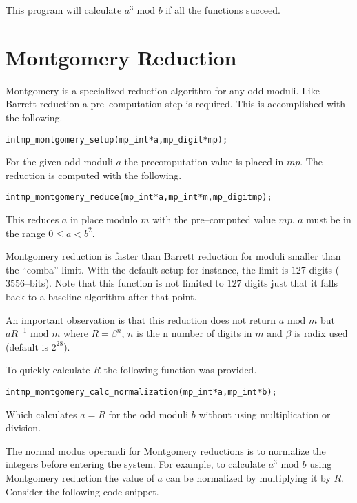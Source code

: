 \documentclass[synpaper]{book}
\begin{document}
This program will calculate $a^3 \mbox{ mod }b$ if all the functions succeed.

\section{Montgomery Reduction}

Montgomery is a specialized reduction algorithm for any odd moduli.  Like Barrett reduction a pre--computation
step is required.  This is accomplished with the following.

\begin{alltt}
int mp_montgomery_setup(mp_int *a, mp_digit *mp);
\end{alltt}

For the given odd moduli $a$ the precomputation value is placed in $mp$.  The reduction is computed with the
following.

\begin{alltt}
int mp_montgomery_reduce(mp_int *a, mp_int *m, mp_digit mp);
\end{alltt}
This reduces $a$ in place modulo $m$ with the pre--computed value $mp$.   $a$ must be in the range
$0 \le a < b^2$.

Montgomery reduction is faster than Barrett reduction for moduli smaller than the ``comba'' limit.  With the default
setup for instance, the limit is $127$ digits ($3556$--bits).   Note that this function is not limited to
$127$ digits just that it falls back to a baseline algorithm after that point.

An important observation is that this reduction does not return $a \mbox{ mod }m$ but $aR^{-1} \mbox{ mod }m$
where $R = \beta^n$, $n$ is the n number of digits in $m$ and $\beta$ is radix used (default is $2^{28}$).

To quickly calculate $R$ the following function was provided.

\begin{alltt}
int mp_montgomery_calc_normalization(mp_int *a, mp_int *b);
\end{alltt}
Which calculates $a = R$ for the odd moduli $b$ without using multiplication or division.

The normal modus operandi for Montgomery reductions is to normalize the integers before entering the system.  For
example, to calculate $a^3 \mbox { mod }b$ using Montgomery reduction the value of $a$ can be normalized by
multiplying it by $R$.  Consider the following code snippet.
\end{document}
